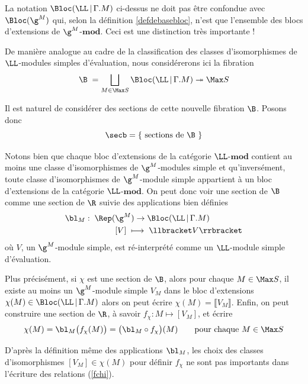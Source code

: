 \begin{Rem} La notation $\Bloc(\LL \, | \, \Gamma.M)$ ci-dessus ne doit pas être confondue avec $\Bloc(\g^M)$ qui, selon la définition \ref{defdebasebloc}, n'est que l'ensemble des blocs d'extensions de \linebreak $\g^M$-$\mathbf{mod}$. Ceci est une distinction très importante !
\end{Rem}

De manière analogue au cadre de la classification des classes d'isomorphismes de $\LL$-modules simples d'évaluation, nous considérerons ici la fibration
$$ \B \; = \bigsqcup_{M \in \Max S} \Bloc(\LL \, | \, \Gamma.M) \twoheadrightarrow \Max S $$

Il est naturel de considérer des sections de cette nouvelle fibration $\B$. Posons donc
$$ \secb = \{ \text{ sections de } \B \text{ }\} $$

Notons bien que chaque bloc d'extensions de la catégorie $\LL$-$\mathbf{mod}$ contient au moins une classe d'isomorphismes de $\g^M$-modules simple et qu'inversément, toute classe d'isomorphismes de $\g^M$-module simple appartient à un bloc d'extensions de la catégorie $\LL$-$\mathbf{mod}$. On peut donc voir une section de $\B$ comme une section de $\R$ suivie des applications bien définies
\begin{align*}
\bl_M : \; \Rep(&\g^M) \rightarrow \Bloc(\LL \, | \, \Gamma.M)\\
&[V] \; \longmapsto \; \llbracket V \rrbracket
\end{align*}
où $V$, un $\g^M$-module simple, est ré-interprété comme un $\LL$-module simple d'évaluation. 

Plus précisément, si $\chi$ est une section de $\B$, alors pour chaque $M \in \Max S$, il existe au moins un $\g^M$-module simple $V_M$ dans le bloc d'extensions $\chi(M) \in \Bloc(\LL \, | \, \Gamma.M)$ alors on peut écrire $\chi(M) = \llbracket V_M \rrbracket$. Enfin, on peut construire une section de $\R$, à savoir $f_\chi : M \mapsto [V_M]$, et écrire 
\begin{equation} \label{fchi}
\chi(M) = \bl_M\big(f_\chi(M)\big) = \big(\bl_M \circ f_\chi\big)(M) \qquad \text{pour chaque } M \in \Max S 
\end{equation}

\begin{Rem} D'après la définition même des applications $\bl_M$, les choix des classes d'isomorphismes $[V_M] \in \chi(M)$ pour définir $f_\chi$ ne sont pas importants dans l'écriture des relations (\ref{fchi}).
\end{Rem}

